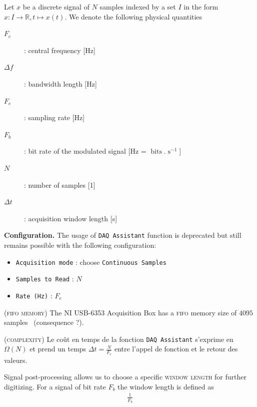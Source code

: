 \documentclass[twocolumn,pre,floats,aps,amsmath,amssymb]{revtex4}
\newenvironment{notation}[1][Notation.]{\begin{trivlist}
\item[\hskip \labelsep {\bfseries #1}]}{\end{trivlist}}
\newenvironment{remark}[1][Remarque.]{\begin{trivlist}
\item[\hskip \labelsep {\bfseries #1}]}{\end{trivlist}}
\begin{document}
\begin{notation}
  Let $x$ be a discrete signal of $N$ samples indexed by a set $I$ in the form $x : I \rightarrow \mathbb{R}, t \mapsto x(t)$. We denote the following physical quantities
  \begin{description}
  \item[$F_c$]{ : central frequency [Hz]}
  \item[$\Delta f$]{ : bandwidth length [Hz]}
  \item[$F_e$]{ : sampling rate [Hz]}
  \item[$F_b$]{ : bit rate of the modulated signal [Hz = $\operatorname{bits}.\operatorname{s}^{-1}$]}
  \item[$N$]{ : number of samples [1]}
  \item[$\Delta t$]{ : acquisition window length [s]}
  \end{description}
\end{notation}

\noindent
\textbf{Configuration.} The usage of \texttt{DAQ Assistant} function is deprecated but still remains possible with the following configuration:
\begin{itemize}
  \item{\texttt{Acquisition mode} : choose \texttt{Continuous Samples}}~\cite{NI_continuous_samp}
  \item{\texttt{Samples to Read} : $N$}
  \item{\texttt{Rate (Hz)} : $F_e$}
\end{itemize}

\begin{remark}
  (\textsc{fifo memory})
  The NI USB-6353 Acquisition Box has a \textsc{fifo} memory size of $4095$ samples~\cite{NI_6353_datasheet} (consequence ?).
\end{remark}

\begin{remark}
  \textsc{(complexity)}
  Le co\^ut en temps de la fonction \texttt{DAQ Assistant} s'exprime en $\Omega(N)$\cite{omega} et prend un temps $\Delta t = \frac{N}{F_e}$ entre l'appel de fonction et le retour des valeurs.
\end{remark}

Signal post-processing allows us to choose a specific \textsc{window length} for further digitizing. For a signal of bit rate $F_b$ the window length is defined as
\begin{eqnarray*}
  \frac{1}{F_b}
\end{eqnarray*}
\end{document}

